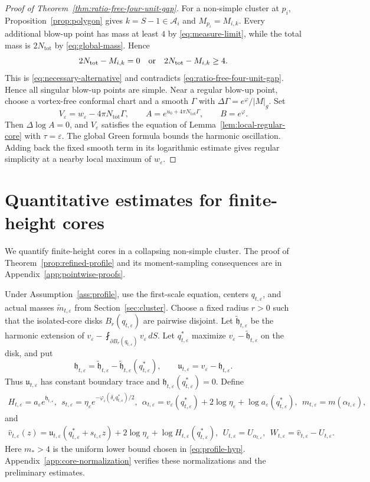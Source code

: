 \documentclass[11pt,reqno]{amsart}
\numberwithin{equation}{section}
\theoremstyle{definition}
\theoremstyle{remark}
\newcommand{\eps}{\varepsilon}
\newcommand{\etae}{\eta_{\eps}}
\newcommand{\de}{\delta_{\eps}}
\newcommand{\tot}{\mathrm{tot}}
\begin{document}
\begin{proof}[Proof of Theorem~\ref{thm:ratio-free-four-unit-gap}]
For a non-simple cluster at $p_i$, Proposition~\ref{prop:polygon} gives
$k=S-1\in\mathscr A_i$ and $M_{p_i}=M_{i,k}$.
Every additional blow-up point has mass at least $4$ by
\eqref{eq:measure-limit}, while the total mass is $2N_{\tot}$ by
\eqref{eq:global-mass}. Hence
\[
 2N_{\tot}-M_{i,k}=0\quad\hbox{or}\quad
 2N_{\tot}-M_{i,k}\ge4.
\]
This is \eqref{eq:necessary-alternative} and contradicts
\eqref{eq:ratio-free-four-unit-gap}. Hence all singular blow-up
points are simple. Near a regular blow-up point, choose a vortex-free
conformal chart and a smooth $\Gamma$ with $\Delta\Gamma=e^\varphi/|M|_g$.
Set
\[
 V_\eps=w_\eps-4\pi N_{\tot}\Gamma,\qquad
 A=e^{u_0+4\pi N_{\tot}\Gamma},\qquad B=e^\varphi.
\]
Then $\Delta\log A=0$, and $V_\eps$ satisfies the equation of
Lemma~\ref{lem:local-regular-core} with $\tau=\eps$.
The global Green formula bounds the harmonic oscillation.
Adding back the fixed smooth term in its logarithmic estimate
gives regular simplicity at a nearby local maximum of $w_\eps$.
\end{proof}

\section{Quantitative estimates for finite-height cores}
\label{sec:pointwise}

We quantify finite-height cores in a collapsing non-simple cluster.
The proof of Theorem~\ref{prop:refined-profile} and its moment-sampling
consequences are in Appendix~\ref{app:pointwise-proofs}.

Under Assumption~\ref{ass:profile}, use the first-scale equation,
centers $q_{t,\eps}$, and actual masses $\widetilde m_{t,\eps}$ from
Section~\ref{sec:cluster}. Choose a fixed radius $r>0$ such that
the isolated-core disks $B_r(q_{t,\eps})$ are pairwise disjoint. Let $\widetilde{\mathfrak h}_{t,\eps}$ be the harmonic
extension of $v_\eps-\fint_{\partial B_r(q_{t,\eps})}v_\eps\,dS$.
Let $q_{t,\eps}^*$ maximize
$v_\eps-\widetilde{\mathfrak h}_{t,\eps}$ on the disk, and put
\[
 \mathfrak h_{t,\eps}
 =\widetilde{\mathfrak h}_{t,\eps}
  -\widetilde{\mathfrak h}_{t,\eps}(q_{t,\eps}^*),
 \qquad
 \mathfrak u_{t,\eps}=v_\eps-\mathfrak h_{t,\eps}.
\]
Thus $\mathfrak u_{t,\eps}$ has constant boundary trace and
$\mathfrak h_{t,\eps}(q_{t,\eps}^*)=0$. Define
\[
 \begin{aligned}
 H_{t,\eps}=a_\eps e^{\mathfrak h_{t,\eps}},
 \ \ s_{t,\eps}=\etae e^{-\varphi_i(\de q_{t,\eps}^*)/2},\ \  
 \alpha_{t,\eps}
 =v_\eps(q_{t,\eps}^*)+2\log\etae
                         +\log a_\eps(q_{t,\eps}^*),
 \ \ m_{t,\eps}=m(\alpha_{t,\eps}),
 \end{aligned}
\]
and
\[
 \begin{aligned}
 \widehat v_{t,\eps}(z)
  =\mathfrak u_{t,\eps}(q_{t,\eps}^*+s_{t,\eps}z)
             +2\log\etae+\log H_{t,\eps}(q_{t,\eps}^*),\ \
 U_{t,\eps} =U_{\alpha_{t,\eps}},\ \
 W_{t,\eps}=\widehat v_{t,\eps}-U_{t,\eps}.
 \end{aligned}
\]
Here $m_*>4$ is the uniform lower bound chosen in
\eqref{eq:profile-hyp}. Appendix~\ref{app:core-normalization} verifies
these normalizations and the preliminary estimates.
\end{document}
